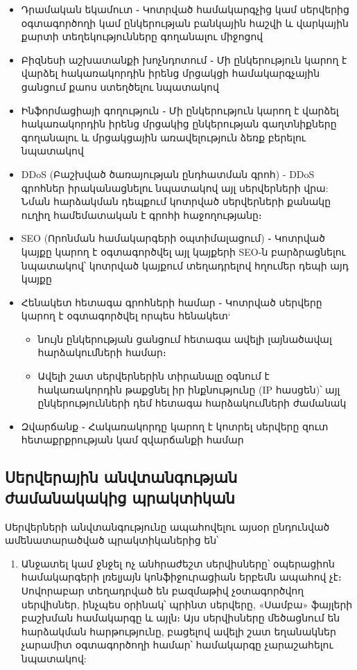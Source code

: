 \documentclass[10pt]{article}
\begin{document}
\begin{sloppypar}
\begin{itemize}
\item Դրամական եկամուտ ֊ Կոտրված համակարգչից կամ սերվերից օգտագործողի
    կամ ընկերության բանկային հաշվի և վարկային քարտի տեղեկությունները
    գողանալու միջոցով
\item Բիզնեսի աշխատանքի խոչնդոտում ֊ Մի ընկերություն կարող է վարձել
    հակառակորդին իրենց մրցակցի համակարգչային ցանցում քաոս ստեղծելու
    նպատակով
\item Ինֆորմացիայի գողություն ֊ Մի ընկերություն կարող է վարձել
    հակառակորդին իրենց մրցակից ընկերության գաղտնիքները գողանալու և
    մրցակցային առավելություն ձեռք բերելու նպատակով
\item DDoS (Բաշխված ծառայության ընդհատման գրոհ) - DDoS գրոհներ
    իրականացնելու նպատակով այլ սերվերների վրա: Նման հարձակման
	դեպքում կոտրված սերվերների քանակը ուղիղ համեմատական է գրոհի
	հաջողությանը։
\item SEO (Որոնման համակարգերի օպտիմալացում) ֊ Կոտրված կայքը կարող է
    օգտագործվել այլ կայքերի SEO-ն բարձրացնելու նպատակով՝ կոտրված կայքում
    տեղադրելով հղումեր դեպի այդ կայքը
\item Հենակետ հետագա գրոհների համար ֊ Կոտրված սերվերը կարող է օգտագործվել
	որպես հենակետ`
	\begin{itemize}
	\item նույն ընկերության ցանցում հետագա ավելի լայնածավալ հարձակումների
		համար։
	\item Ավելի շատ սերվերներին տիրանալը օգնում է հակառակորդին թաքցնել
		իր ինքնությունը (IP հասցեն)՝ այլ ընկերությունների դեմ հետագա
		հարձակումների ժամանակ
	\end{itemize}
\item Զվարճանք ֊ Հակառակորդը կարող է կոտրել սերվերը զուտ հետաքրքրության կամ
    զվարճանքի համար
\end{itemize}


\subsection{Սերվերային անվտանգության ժամանակակից պրակտիկան}


Սերվերների անվտանգությունը ապահովելու այսօր ընդունված ամենատարածված
պրակտիկաներից են՝

\begin{enumerate}
\item Անջատել կամ ջնջել ոչ անհրաժեշտ սերվիսները՝
    օպերացիոն համակարգերի լռելյայն կոնֆիջուրացիան երբեմն ապահով չէ։
    Սովորաբար տեղադրված են բազմաթիվ չօտագործվող սերվիսներ, ինչպես
    օրինակ՝ պրինտ սերվերը, «Սամբա» ֆայլերի բաշխման համակարգը և այլն։
	Այս սերվիսները
    մեծացնում են հարձակման հարթությունը, բացելով ավելի շատ եղանակներ
    չարամիտ օգտագործողի համար՝ համակարգը չարաշահելու նպատակով:


\end{enumerate}
\end{sloppypar}
\end{document}
